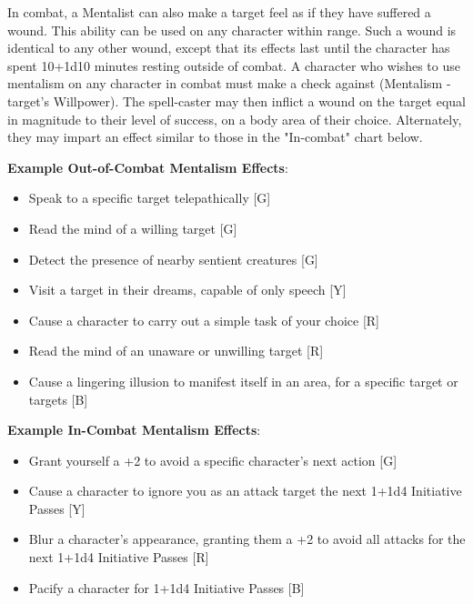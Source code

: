 \documentclass[oneside]{book}
\begin{document}
\begin{multicols}{2}
In combat, a Mentalist can also make a target feel as if they have suffered a wound. This ability can be used on any character within range. Such a wound is identical to any other wound, except that its effects last until the character has spent 10+1d10 minutes resting outside of combat. A character who wishes to use mentalism on any character in combat must make a check against (Mentalism - target's Willpower). The spell-caster may then inflict a wound on the target equal in magnitude to their level of success, on a body area of their choice. Alternately, they may impart an effect similar to those in the "In-combat" chart below.  

\textbf{Example Out-of-Combat Mentalism Effects}:
	\begin{itemize}
		\setlength{\itemsep}{0cm}%
  		\setlength{\parskip}{0cm}%
		\item{ \small Speak to a specific target telepathically [G]}
		\item{ \small Read the mind of a willing target [G]}
		\item{ \small Detect the presence of nearby sentient creatures [G]}
		\item{ \small Visit a target in their dreams, capable of only speech [Y]}
		\item{ \small Cause a character to carry out a simple task of your choice [R]}
		\item{ \small Read the mind of an unaware or unwilling target [R]}
		\item{ \small Cause a lingering illusion to manifest itself in an area, for a specific target or targets [B]}
	\end{itemize}
	
\textbf{Example In-Combat Mentalism Effects}:
	\begin{itemize}
		\setlength{\itemsep}{0cm}%
  		\setlength{\parskip}{0cm}%
		\item{ \small Grant yourself a +2 to avoid a specific character's next action [G]}
		\item{ \small Cause a character to ignore you as an attack target the next 1+1d4 Initiative Passes [Y]}
		\item{ \small Blur a character's appearance, granting them a +2 to avoid all attacks for the next 1+1d4 Initiative Passes [R]}
		\item{ \small Pacify a character for 1+1d4 Initiative Passes [B]}
	\end{itemize}
	
	

\end{multicols}
\end{document}
